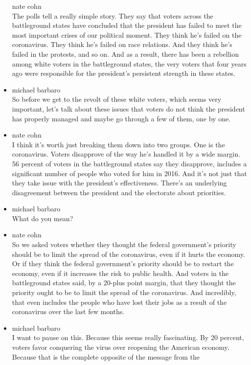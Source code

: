 \begin{itemize}
  nate cohn\\
  The polls tell a really simple story. They say that voters across the
  battleground states have concluded that the president has failed to
  meet the most important crises of our political moment. They think
  he's failed on the coronavirus. They think he's failed on race
  relations. And they think he's failed in the protests, and so on. And
  as a result, there has been a rebellion among white voters in the
  battleground states, the very voters that four years ago were
  responsible for the president's persistent strength in these states.
\item
  michael barbaro\\
  So before we get to the revolt of these white voters, which seems very
  important, let's talk about these issues that voters do not think the
  president has properly managed and maybe go through a few of them, one
  by one.
\item
  nate cohn\\
  I think it's worth just breaking them down into two groups. One is the
  coronavirus. Voters disapprove of the way he's handled it by a wide
  margin. 56 percent of voters in the battleground states say they
  disapprove, includes a significant number of people who voted for him
  in 2016. And it's not just that they take issue with the president's
  effectiveness. There's an underlying disagreement between the
  president and the electorate about priorities.
\item
  michael barbaro\\
  What do you mean?
\item
  nate cohn\\
  So we asked voters whether they thought the federal government's
  priority should be to limit the spread of the coronavirus, even if it
  hurts the economy. Or if they think the federal government's priority
  should be to restart the economy, even if it increases the risk to
  public health. And voters in the battleground states said, by a
  20-plus point margin, that they thought the priority ought to be to
  limit the spread of the coronavirus. And incredibly, that even
  includes the people who have lost their jobs as a result of the
  coronavirus over the last few months.
\item
  michael barbaro\\
  I want to pause on this. Because this seems really fascinating. By 20
  percent, voters favor conquering the virus over reopening the American
  economy. Because that is the complete opposite of the message from the

\end{itemize}
